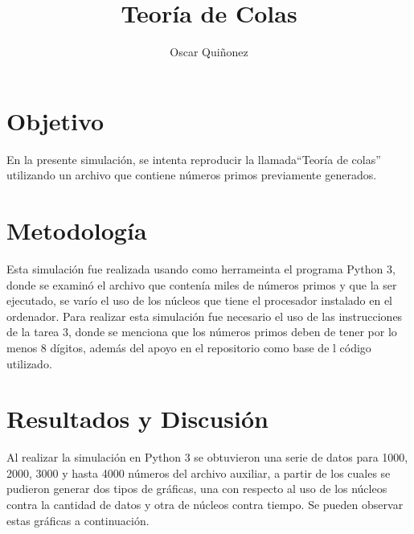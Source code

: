 \documentclass{article}
\title { Teor\'ia de Colas}
\author{Oscar Qui\~nonez}
\begin{document}
\maketitle
 
\section{Objetivo}\label{met}

En la presente simulaci\'on, se intenta reproducir la llamada``Teor\'ia de colas'' utilizando un archivo que contiene n\'umeros primos previamente generados.

\section{Metodolog\'ia}\label{met}

Esta simulaci\'on fue realizada usando como herrameinta el programa Python 3, donde se examin\'o el archivo que conten\'ia miles de n\'umeros primos y que la ser ejecutado, se var\'io el uso de los n\'ucleos que tiene el procesador instalado en el ordenador. Para realizar esta simulaci\'on fue necesario el uso de las instrucciones \cite{satuelisa} de la tarea 3, donde se menciona que los n\'umeros primos deben de tener por lo menos 8 d\'igitos, adem\'as del apoyo en el repositorio  \citet{baz} como base de l c\'odigo utilizado.

\section{Resultados y Discusi\'on}\label{res}

Al realizar la simulaci\'on en Python 3 se obtuvieron una serie de datos para 1000, 2000, 3000 y hasta 4000 n\'umeros del archivo auxiliar, a partir de los cuales se pudieron generar dos tipos de gr\'aficas, una con respecto al uso de los n\'ucleos contra la cantidad de datos y otra de n\'ucleos contra tiempo. Se pueden observar estas gr\'aficas a continuaci\'on.
\end{document}
